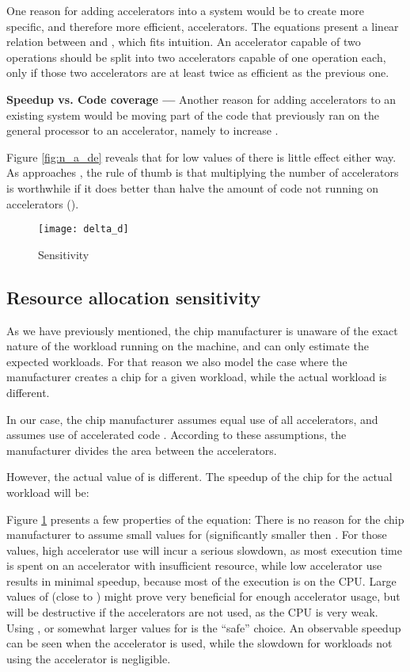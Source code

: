 \documentclass[twocolumn,english]{IEEEtran}
\begin{document}
One reason for adding accelerators into a system would be to create
more specific, and therefore more efficient, accelerators. The equations
present a linear relation between  and , which fits intuition.
An accelerator capable of two operations should be split into two
accelerators capable of one operation each, only if those two accelerators
are at least twice as efficient as the previous one.

\textbf{Speedup vs. Code coverage --- }Another reason for adding accelerators
to an existing system would be moving part of the code that previously
ran on the general processor to an accelerator, namely to increase
.

Figure \ref{fig:n_a_de} reveals that for low values of 
there is little effect either way. As  approaches , the
rule of thumb is that multiplying the number of accelerators is worthwhile
if it does better than halve the amount of code not running on accelerators
().

\begin{figure}[t]
\texttt{[image: delta\_d]}

\caption{\label{fig:sensitivity}Sensitivity }
\end{figure}



\subsection{Resource allocation sensitivity}

As we have previously mentioned, the chip manufacturer is unaware
of the exact nature of the workload running on the machine, and can
only estimate the expected workloads. For that reason we also model
the case where the manufacturer creates a chip for a given workload,
while the actual workload is different.

In our case, the chip manufacturer assumes equal use of all accelerators,
and assumes use of accelerated code . According to these
assumptions, the manufacturer divides the area between the accelerators.




However, the actual value of  is different. The speedup of
the chip for the actual workload will be:




Figure \ref{fig:sensitivity} presents a few properties of the equation:
There is no reason for the chip manufacturer to assume small values
for  (significantly smaller then . For those values,
high accelerator use will incur a serious slowdown, as most execution
time is spent on an accelerator with insufficient resource, while
low accelerator use results in minimal speedup, because most of the
execution is on the CPU. Large values of  (close to ) might
prove very beneficial for enough accelerator usage, but will be destructive
if the accelerators are not used, as the CPU is very weak. Using ,
or somewhat larger values for  is the {}``safe'' choice. An
observable speedup can be seen when the accelerator is used, while
the slowdown for workloads not using the accelerator is negligible. 
\end{document}
